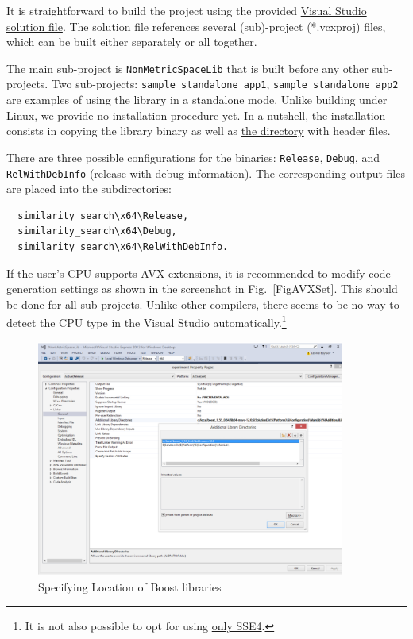 \documentclass[runningheads,a4paper]{llncs}
\newcommand{\replocdir}{https://github.com/searchivarius/NonMetricSpaceLib/tree/develop}
\newcommand{\replocfile}{https://github.com/searchivarius/NonMetricSpaceLib/blob/develop/}
\newcommand{\ttt}[1]{\texttt{#1}}
\begin{document}
{It is straightforward to build the project
using the provided \href{\replocfile similarity_search/NonMetricSpaceLib.sln}{Visual Studio 
solution file}.
The solution file references several (sub)-project (*.vcxproj) files,
which can be built either separately or all together.

The main sub-project is \ttt{NonMetricSpaceLib} that is built before 
any other sub-projects. 
Two sub-projects: 
\ttt{sample\_standalone\_app1},
\ttt{sample\_standalone\_app2} 
are examples of using the library in a standalone mode.
Unlike building under Linux, we provide no installation procedure yet.
In a nutshell, the installation consists in copying the library binary
as well as \href{\replocdir similarity_search/include}{the directory} with header files.

There are three possible configurations for the binaries: 
\ttt{Release}, \ttt{Debug}, and \ttt{RelWithDebInfo} (release with debug information). 
The corresponding output files are placed into the subdirectories:
\begin{verbatim}
  similarity_search\x64\Release,
  similarity_search\x64\Debug,
  similarity_search\x64\RelWithDebInfo.
\end{verbatim}

If the user's CPU supports \href{https://en.wikipedia.org/wiki/Advanced_Vector_Extensions}{AVX extensions}, it is recommended to modify code generation settings as shown in the screenshot in Fig.~\ref{FigAVXSet}.
This should be done for all sub-projects.
Unlike other compilers, there seems to be no way to detect the CPU type in the Visual Studio automatically.\footnote{It is not also possible to opt for using \href{http://en.wikipedia.org/wiki/SSE4}{only SSE4}.}

\begin{figure}
\centering
\caption{\label{FigBoostSet}Specifying Location of Boost libraries}
\includegraphics[width=0.9\textwidth]{figures/SettingBoostLocation.pdf}
\end{figure}

}
\end{document}
